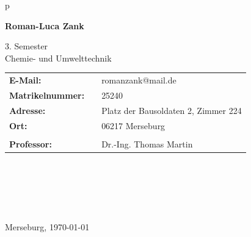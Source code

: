 \begin{center}
\begin{tabular}{p{\textwidth}}
\begin{center}
\Large{\textbf{Roman-Luca Zank}} \\
\end{center}

\begin{center}
3. Semester \\
Chemie- und Umwelttechnik \\
\end{center}


\begin{center}
\begin{tabular}{lll}
	\textbf{E-Mail:} & & romanzank@mail.de\\
	\textbf{Matrikelnummer:} & &25240\\
	\textbf{Adresse:} & &Platz der Bausoldaten 2, Zimmer 224\\
	\textbf{Ort:} & &06217 Merseburg\\
	&& \\
	\textbf{Professor:} & & Dr.-Ing. Thomas Martin\\
\end{tabular}
\end{center}

\\ \\ \\ \\ \\
\large{Merseburg, \today}

\end{tabular}
\end{center}
